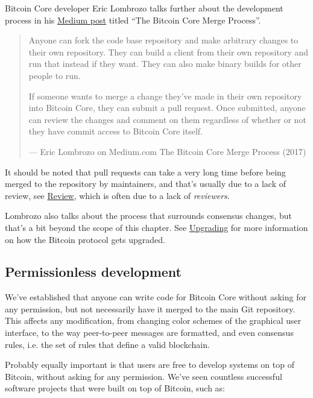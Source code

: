 Bitcoin Core developer Eric Lombrozo talks further about the development
process in his
\href{https://medium.com/@elombrozo/the-bitcoin-core-merge-process-74687a09d81d}{Medium
post} titled ``The Bitcoin Core Merge Process''.

\begin{quote}
Anyone can fork the code base repository and make arbitrary changes to
their own repository. They can build a client from their own repository
and run that instead if they want. They can also make binary builds for
other people to run.

If someone wants to merge a change they've made in their own repository
into Bitcoin Core, they can submit a pull request. Once submitted,
anyone can review the changes and comment on them regardless of whether
or not they have commit access to Bitcoin Core itself.

---  Eric Lombrozo on Medium.com The Bitcoin Core Merge Process (2017)
\end{quote}

It should be noted that pull requests can take a very long time before
being merged to the repository by maintainers, and that's usually due to
a lack of review, see \protect\hyperlink{review}{Review}, which is often
due to a lack of \emph{reviewers}.

Lombrozo also talks about the process that surrounds consensus changes,
but that's a bit beyond the scope of this chapter. See
\protect\hyperlink{upgrading}{Upgrading} for more information on how the
Bitcoin protocol gets upgraded.

\hypertarget{_permissionless_development}{%
\subsection{Permissionless
development}\label{_permissionless_development}}

We've established that anyone can write code for Bitcoin Core without
asking for any permission, but not necessarily have it merged to the
main Git repository. This affects any modification, from changing color
schemes of the graphical user interface, to the way peer-to-peer
messages are formatted, and even consensus rules, i.e. the set of rules
that define a valid blockchain.

Probably equally important is that users are free to develop systems on
top of Bitcoin, without asking for any permission. We've seen countless
successful software projects that were built on top of Bitcoin, such as:

